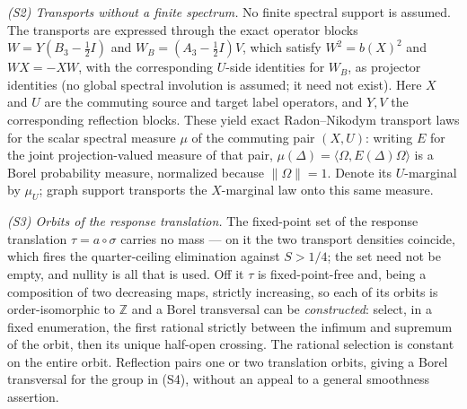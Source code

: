 \documentclass[11pt]{article}
\theoremstyle{remark}
\begin{document}
\emph{(S2) Transports without a finite spectrum.} No finite spectral
support is assumed. The transports are expressed through the exact operator blocks
$W=Y(B_3-\tfrac12 I)$ and $W_B=(A_3-\tfrac12 I)V$, which satisfy
$W^2=b(X)^2$ and $WX=-XW$, with the
corresponding $U$-side identities for $W_B$, as projector identities (no
global spectral involution is assumed; it need not exist). Here $X$ and
$U$ are the commuting source and target label operators, and $Y,V$ the
corresponding reflection blocks. These yield exact Radon--Nikodym transport laws for the
scalar spectral measure $\mu$ of the commuting pair $(X,U)$: writing $E$ for
the joint projection-valued measure of that pair, $\mu(\Delta)
=\langle\Omega,E(\Delta)\Omega\rangle$ is a Borel probability measure,
normalized because $\|\Omega\|=1$. Denote its $U$-marginal by $\mu_U$;
graph support transports the $X$-marginal law onto this same measure.

\emph{(S3) Orbits of the response translation.}
The fixed-point set of the response translation $\tau=a\circ\sigma$ carries
no mass --- on it the two transport densities coincide, which fires the
quarter-ceiling elimination against $S>1/4$; the set need not be empty, and
nullity is all that is used. Off it $\tau$ is fixed-point-free and, being a
composition of two decreasing maps, strictly increasing, so each of its
orbits is order-isomorphic to $\mathbb{Z}$ and a Borel transversal can be
\emph{constructed}: select, in a fixed enumeration, the first rational
strictly between the infimum and supremum of the orbit, then its unique
half-open crossing. The rational selection is constant on the entire
orbit. Reflection pairs one or two translation orbits, giving a Borel
transversal for the group in (S4), without an appeal to a general
smoothness assertion.
\end{document}
